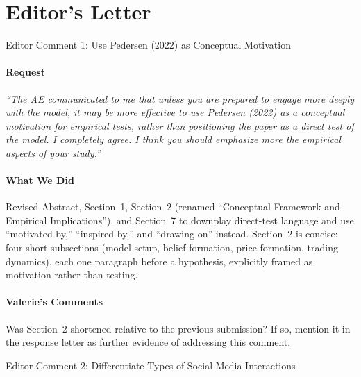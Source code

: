 \documentclass[11pt]{article}
\makeatletter
\def\section{\@ifstar\section@star\section@nostar}
\def\section@star#1{%
  \par\vspace{1.5ex}%
  \noindent{\normalsize\bfseries#1}\par%
  \vspace{0.5ex}%
  \@afterheading%
}
\def\section@nostar#1{%
  \par\vspace{1.5ex}%
  \noindent{%
    \setlength{\fboxsep}{4pt}%
    \colorbox{sectionbg}{\parbox{\dimexpr\textwidth-8pt\relax}{\normalsize\bfseries\strut#1\strut}}%
  }\par%
  \vspace{0.5ex}%
  \@afterheading%
}
\newcommand{\openq}[1]{#1}
\makeatother
\begin{document}
\part{Editor's Letter}

\section{Editor Comment 1: Use Pedersen (2022) as Conceptual Motivation}

\subsection*{Request}
\begin{mdframed}
\textit{``The AE communicated to me that unless you are prepared to engage
more deeply with the model, it may be more effective to use Pedersen (2022)
as a conceptual motivation for empirical tests, rather than positioning the
paper as a direct test of the model. I completely agree. I think you should
emphasize more the empirical aspects of your study.''}
\end{mdframed}

\subsection*{What We Did}
Revised Abstract, Section~1, Section~2 (renamed ``Conceptual Framework and
Empirical Implications''), and Section~7 to downplay direct-test language
and use ``motivated by,'' ``inspired by,'' and ``drawing on'' instead.
Section~2 is concise: four short subsections (model setup, belief formation,
price formation, trading dynamics), each one paragraph before a hypothesis,
explicitly framed as motivation rather than testing.

\subsection*{Valerie's Comments}
\openq{Was Section~2 shortened relative to the previous submission? If so,
mention it in the response letter as further evidence of addressing this
comment.}

\section{Editor Comment 2: Differentiate Types of Social Media Interactions}
\end{document}

